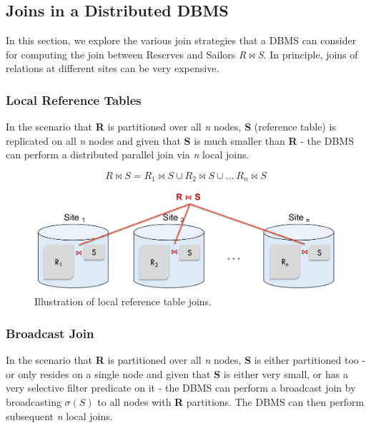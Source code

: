 \subsection{Joins in a Distributed DBMS}
In this section, we explore the various join strategies that a DBMS can consider for computing the join between Reserves and Sailors \textit{R$\Join$S}. In principle, joins of relations at different sites can be very expensive.

\subsubsection{Local Reference Tables}
In the scenario that \textbf{R} is partitioned over all \textit{n} nodes, \textbf{S} (reference table) is replicated on all \textit{n} nodes and given that \textbf{S} is much smaller than \textbf{R} - the DBMS can perform a distributed parallel join via \textit{n} local joins.

\begin{equation}
R \Join S = R_1 \Join S \cup R_2 \Join S \cup ...\ R_n \Join S
\end{equation}

\begin{figure}[h]
  \centering
  \includegraphics[width=\linewidth]{figures/local-reference-join.png}
  \caption{Illustration of local reference table joins.}
  \label{fig:local-reference-join}
\end{figure}

\subsubsection{Broadcast Join}
In the scenario that \textbf{R} is partitioned over all \textit{n} nodes, \textbf{S} is either partitioned too - or only resides on a single node and given that \textbf{S} is either very small, or has a very selective filter predicate on it - the DBMS can perform a broadcast join by broadcasting $\sigma(S)$ to all nodes with \textbf{R} partitions. The DBMS can then perform subsequent \textit{n} local joins.

